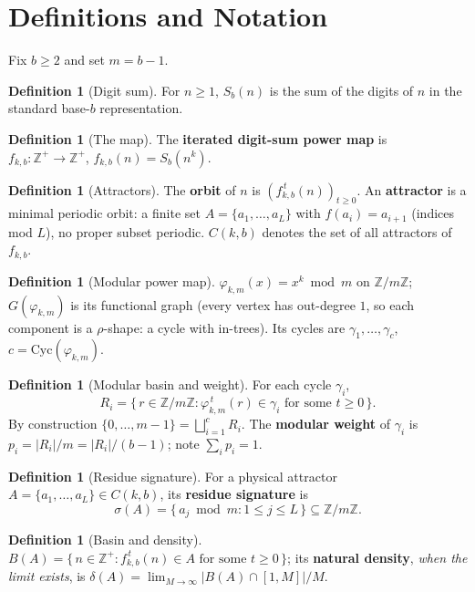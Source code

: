 \documentclass[11pt]{article}
\theoremstyle{definition}
\newtheorem{definition}[theorem]{Definition}
\theoremstyle{remark}
\newcommand{\Cyc}{\mathrm{Cyc}}
\begin{document}
\section{Definitions and Notation}

Fix $b \ge 2$ and set $m = b-1$.

\begin{definition}[Digit sum]
For $n \ge 1$, $S_b(n)$ is the sum of the digits of $n$ in the standard base-$b$ representation.
\end{definition}

\begin{definition}[The map]
The \textbf{iterated digit-sum power map} is $f_{k,b}\colon \mathbb{Z}^+ \to \mathbb{Z}^+$, $f_{k,b}(n) = S_b(n^k)$.
\end{definition}

\begin{definition}[Attractors]
The \textbf{orbit} of $n$ is $(f_{k,b}^{\,t}(n))_{t \ge 0}$. An \textbf{attractor} is a minimal periodic orbit: a finite set $A = \{a_1,\dots,a_L\}$ with $f(a_i) = a_{i+1}$ (indices mod $L$), no proper subset periodic. $C(k,b)$ denotes the set of all attractors of $f_{k,b}$.
\end{definition}

\begin{definition}[Modular power map]
$\varphi_{k,m}(x) = x^k \bmod m$ on $\mathbb{Z}/m\mathbb{Z}$; $G(\varphi_{k,m})$ is its functional graph (every vertex has out-degree $1$, so each component is a $\rho$-shape: a cycle with in-trees). Its cycles are $\gamma_1,\dots,\gamma_c$, $c = \Cyc(\varphi_{k,m})$.
\end{definition}

\begin{definition}[Modular basin and weight]
For each cycle $\gamma_i$,
\[
R_i = \{\, r \in \mathbb{Z}/m\mathbb{Z} : \varphi_{k,m}^{\,t}(r) \in \gamma_i \text{ for some } t \ge 0 \,\}.
\]
By construction $\{0,\dots,m-1\} = \bigsqcup_{i=1}^{c} R_i$. The \textbf{modular weight} of $\gamma_i$ is $p_i = |R_i|/m = |R_i|/(b-1)$; note $\sum_i p_i = 1$.
\end{definition}

\begin{definition}[Residue signature]
For a physical attractor $A = \{a_1,\dots,a_L\} \in C(k,b)$, its \textbf{residue signature} is
\[
\sigma(A) = \{\, a_j \bmod m : 1 \le j \le L \,\} \subseteq \mathbb{Z}/m\mathbb{Z}.
\]
\end{definition}

\begin{definition}[Basin and density]
$B(A) = \{\, n \in \mathbb{Z}^+ : f_{k,b}^{\,t}(n) \in A \text{ for some } t \ge 0 \,\}$; its \textbf{natural density}, \emph{when the limit exists}, is $\delta(A) = \lim_{M\to\infty} |B(A) \cap [1,M]|/M$.
\end{definition}
\end{document}
